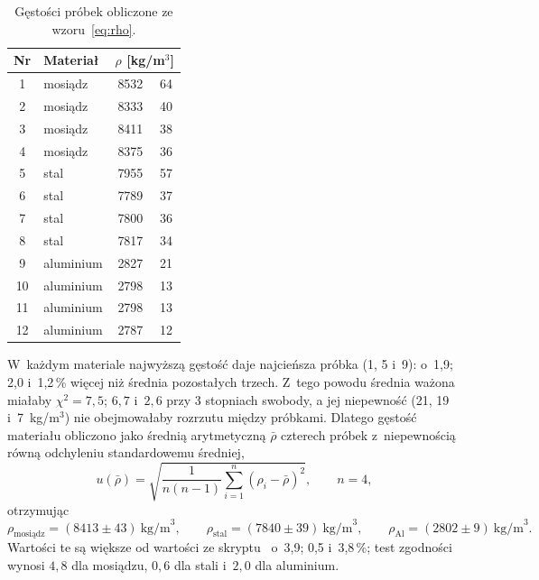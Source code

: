 \documentclass[12pt, a4paper]{article}
\begin{document}
\begin{table}[H]
    \centering
    \caption{Gęstości próbek obliczone ze wzoru~\eqref{eq:rho}.}
    \label{tab:rho}
    \begin{tabular}{cl S[table-format=4.0]@{\,$\pm$\,}S[table-format=2.0]}
        \toprule
        Nr & Materiał &  \\
          & mosiądz   & 8532 & 64 \\
        2  & mosiądz   & 8333 & 40 \\
        3  & mosiądz   & 8411 & 38 \\
        4  & mosiądz   & 8375 & 36 \\
          & stal      & 7955 & 57 \\
        6  & stal      & 7789 & 37 \\
        7  & stal      & 7800 & 36 \\
        8  & stal      & 7817 & 34 \\
          & aluminium & 2827 & 21 \\
        10 & aluminium & 2798 & 13 \\
        11 & aluminium & 2798 & 13 \\
        12 & aluminium & 2787 & 12 \\
        \bottomrule
    \end{tabular}
\end{table}

W~każdym materiale najwyższą gęstość daje najcieńsza próbka (1, 5 i~9): o~1,9; 2,0 i~1,2\,\%
więcej niż średnia pozostałych trzech. Z~tego powodu średnia ważona miałaby
$\chi^2 = 7{,}5$; $6{,}7$ i~$2{,}6$ przy 3 stopniach swobody, a jej niepewność
(21, 19 i~7~kg/m$^3$) nie obejmowałaby rozrzutu między próbkami. Dlatego gęstość materiału
obliczono jako średnią arytmetyczną $\bar\rho$ czterech próbek z~niepewnością równą
odchyleniu standardowemu średniej,
\begin{equation}
    u(\bar\rho) = \sqrt{\frac{1}{n(n-1)}\sum_{i=1}^{n}\left(\rho_i - \bar\rho\right)^2}, \qquad n = 4,
    \label{eq:u_sr}
\end{equation}
otrzymując
\begin{equation*}
    \rho_\text{mosiądz} = (8413 \pm 43)~\text{kg/m}^3, \qquad
    \rho_\text{stal} = (7840 \pm 39)~\text{kg/m}^3, \qquad
    \rho_\text{Al} = (2802 \pm 9)~\text{kg/m}^3.
\end{equation*}
Wartości te są większe od wartości ze skryptu~\cite{skrypt} o~3,9; 0,5 i~3,8\,\%; test
zgodności wynosi $4{,}8$ dla mosiądzu, $0{,}6$ dla stali i~$2{,}0$ dla aluminium.
\end{document}
